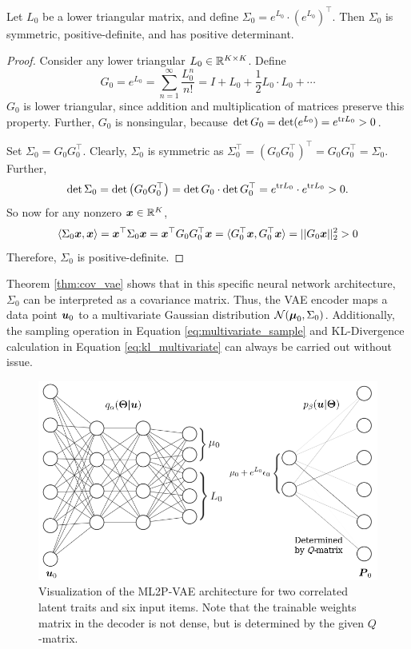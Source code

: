 \begin{theorem}
  Let $L_0$ be a lower triangular matrix, and define $\Sigma_0 = e^{L_0} \cdot \left(e^{L_0}\right)^\top$. Then $\Sigma_0$ is symmetric, positive-definite, and has positive determinant.
  \label{thm:cov_vae}
\end{theorem}
\begin{proof}
  Consider any lower triangular $L_0 \in \mathbb{R}^{K\times K}$. Define 
  \[G_0 = e^{L_0} = \sum_{n=1}^\infty \frac{L_0^n}{n!} = I + L_0 + \frac{1}{2} L_0 \cdot L_0 + \cdots\]
  $G_0$ is lower triangular, since addition and multiplication of matrices preserve this property. Further, $G_0$ is nonsingular, because $\det G_0 = \det(e^{L_0}) = e^{\text{tr} L_0} > 0$.

  Set $\Sigma_0 = G_0 G_0^\top$. Clearly, $\Sigma_0$ is symmetric as $\Sigma_0^\top = (G_0 G_0^\top)^\top = G_0 G_0^\top = \Sigma_0$. Further, 
  \[\det \Sigma_0 = \det \left(G_0 G_0^\top \right) = \det G_0 \cdot \det G_0^\top = e^{\text{tr} L_0} \cdot e^{\text{tr} L_0} > 0.\]
So now for any nonzero $\boldsymbol{x} \in \mathbb{R}^K$,
  \[\langle \Sigma_0 \boldsymbol{x}, \boldsymbol{x} \rangle = \boldsymbol{x}^\top \Sigma_0 \boldsymbol{x} = \boldsymbol{x}^\top G_0 G_0^\top \boldsymbol{x} = \langle G_0^\top \boldsymbol{x}, G_0^\top \boldsymbol{x} \rangle = ||G_0 \boldsymbol{x}||_2^2 > 0\]
  Therefore, $\Sigma_0$ is positive-definite.
\end{proof}

Theorem \ref{thm:cov_vae} shows that in this specific neural network architecture, $\Sigma_0$ can be interpreted as a covariance matrix. Thus, the VAE encoder maps a data point $\boldsymbol{u}_0$ to a multivariate Gaussian distribution $\mathcal{N}(\boldsymbol{\mu}_0, \Sigma_0)$. Additionally, the sampling operation in Equation \ref{eq:multivariate_sample} and KL-Divergence calculation in Equation \ref{eq:kl_multivariate} can always be carried out without issue.

\begin{figure}[h]
  \centering
  \includegraphics[width=.85\textwidth]{img/ml2pvae_visual.png}
  \caption{Visualization of the ML2P-VAE architecture for two correlated latent traits and six input items. Note that the trainable weights matrix in the decoder is not dense, but is determined by the given $Q$-matrix.}
  \label{fig:ml2pvae_visual}
\end{figure}

